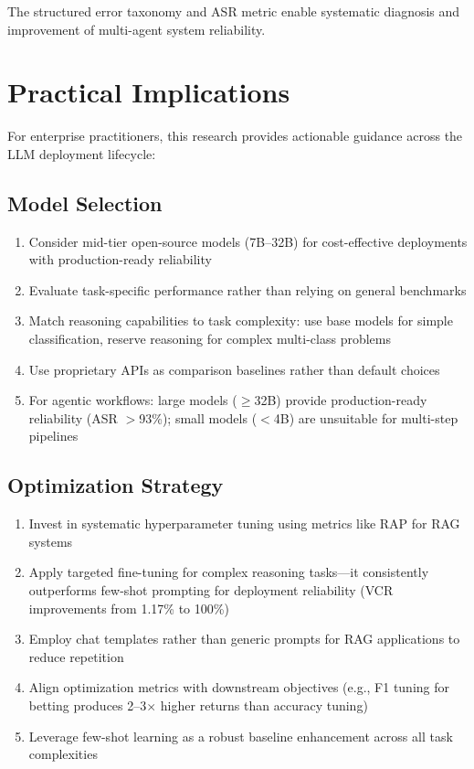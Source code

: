 The structured error taxonomy and ASR metric enable systematic diagnosis and improvement of multi-agent system reliability.

\section{Practical Implications}
\label{sec:practical_implications}

For enterprise practitioners, this research provides actionable guidance across the LLM deployment lifecycle:

\subsection{Model Selection}

\begin{enumerate}[leftmargin=*]
    \item Consider mid-tier open-source models (7B--32B) for cost-effective deployments with production-ready reliability
    \item Evaluate task-specific performance rather than relying on general benchmarks
    \item Match reasoning capabilities to task complexity: use base models for simple classification, reserve reasoning for complex multi-class problems
    \item Use proprietary APIs as comparison baselines rather than default choices
    \item For agentic workflows: large models ($\geq$32B) provide production-ready reliability (ASR $>$93\%); small models ($<$4B) are unsuitable for multi-step pipelines
\end{enumerate}

\subsection{Optimization Strategy}

\begin{enumerate}[leftmargin=*]
    \item Invest in systematic hyperparameter tuning using metrics like RAP for RAG systems
    \item Apply targeted fine-tuning for complex reasoning tasks---it consistently outperforms few-shot prompting for deployment reliability (VCR improvements from 1.17\% to 100\%)
    \item Employ chat templates rather than generic prompts for RAG applications to reduce repetition
    \item Align optimization metrics with downstream objectives (e.g., F1 tuning for betting produces 2--3$\times$ higher returns than accuracy tuning)
    \item Leverage few-shot learning as a robust baseline enhancement across all task complexities
\end{enumerate}

